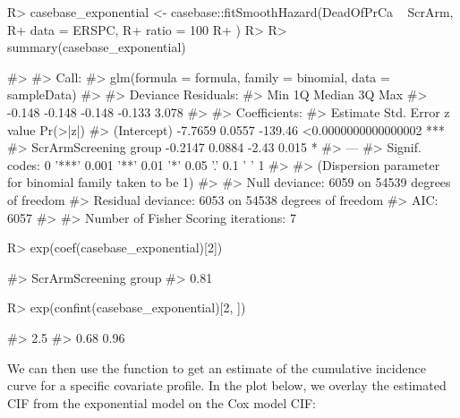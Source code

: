 \documentclass[
]{jss}
\begin{document}
\begin{CodeChunk}

\begin{CodeInput}
R> casebase_exponential <- casebase::fitSmoothHazard(DeadOfPrCa ~ ScrArm,
R+   data = ERSPC,
R+   ratio = 100
R+ )
R> 
R> summary(casebase_exponential)
\end{CodeInput}

\begin{CodeOutput}
#> 
#> Call:
#> glm(formula = formula, family = binomial, data = sampleData)
#> 
#> Deviance Residuals: 
#>    Min      1Q  Median      3Q     Max  
#> -0.148  -0.148  -0.148  -0.133   3.078  
#> 
#> Coefficients:
#>                       Estimate Std. Error z value            Pr(>|z|)    
#> (Intercept)            -7.7659     0.0557 -139.46 <0.0000000000000002 ***
#> ScrArmScreening group  -0.2147     0.0884   -2.43               0.015 *  
#> ---
#> Signif. codes:  0 '***' 0.001 '**' 0.01 '*' 0.05 '.' 0.1 ' ' 1
#> 
#> (Dispersion parameter for binomial family taken to be 1)
#> 
#>     Null deviance: 6059  on 54539  degrees of freedom
#> Residual deviance: 6053  on 54538  degrees of freedom
#> AIC: 6057
#> 
#> Number of Fisher Scoring iterations: 7
\end{CodeOutput}

\begin{CodeInput}
R> exp(coef(casebase_exponential)[2])
\end{CodeInput}

\begin{CodeOutput}
#> ScrArmScreening group 
#>                  0.81
\end{CodeOutput}

\begin{CodeInput}
R> exp(confint(casebase_exponential)[2, ])
\end{CodeInput}

\begin{CodeOutput}
#>  2.5 %
#>   0.68   0.96
\end{CodeOutput}
\end{CodeChunk}

We can then use the  function to get an estimate of
the cumulative incidence curve for a specific covariate profile. In the
plot below, we overlay the estimated CIF from the exponential model on
the Cox model CIF:
\end{document}
